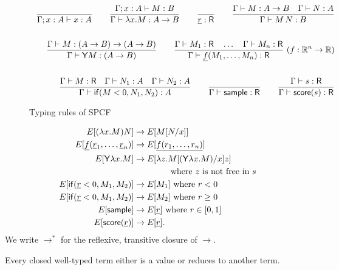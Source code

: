 \begin{figure*}
\begin{align*}
  \frac{}{\Gamma ; x:A \vdash x:A} 
  \qquad
  \frac{\Gamma ; x:A \vdash M : B}{\Gamma \vdash \lambda x.M : A \to B} 
  \qquad
  \frac{}{\underline{r} : \textsf{R}} 
  \qquad
  \frac{\Gamma \vdash M:A \to B \quad \Gamma \vdash N : A}{\Gamma \vdash M \, N : B} 
  \\ \\
  \qquad
  \frac{\Gamma \vdash M : (A \to B) \to (A \to B)}{\Gamma \vdash \mathsf{Y} M : (A \to B)}
  \qquad
  \frac{\Gamma \vdash M_1:\textsf{R} \quad \dots \quad \Gamma \vdash M_n:\textsf{R}}{\Gamma \vdash \underline{f}(M_1,\dots,M_n) : \textsf{R}} \ (f : \mathbb{R}^n \to \mathbb{R})    
  \\ \\
  \qquad
  \frac{\Gamma \vdash M : \textsf{R} \quad \Gamma \vdash N_1 : A \quad \Gamma \vdash N_2 : A}{\Gamma \vdash \mathsf{if}(M < 0, N_1, N_2) : A}
  \qquad
  \frac{}{\Gamma \vdash \mathsf{sample} : \textsf{R}} 
  \qquad
  \frac{\Gamma \vdash s : \textsf{R}}{\Gamma \vdash \mathsf{score} (s) : \textsf{R}}
\end{align*}
\caption{Typing rules of SPCF \label{fig:typing rules}}
\end{figure*}

\begin{align*}
  E[(\lambda x.M) N] & \to E[M[N/x]] \\
  E[\underline f (\underline r_1, \dots , \underline r_n)] & \to E[\underline{f(r_1,\dots,r_n)}] \\
  E[\mathsf{Y} \lambda x. M] & \to E[\lambda z. M[(\mathsf{Y} \lambda x. M)/x] z] \\
  & \qquad \qquad \text{ where $z$ is not free in $s$}\\
  E[\mathsf{if}(\underline r < 0, M_1, M_2)] & \to E[M_1] \text{ where }r < 0 \\
  E[\mathsf{if}(\underline r < 0, M_1, M_2)] & \to E[M_2] \text{ where }r \geq 0 \\
  E[\mathsf{sample}] & \to E[\underline r] \text{ where } r \in [0,1] \\
  E[\mathsf{score}(\underline r)] & \to E[\underline r].
\end{align*}
We write $\to^\ast$ for the reflexive, transitive closure of $\to$.

Every closed well-typed term either is a value or reduces to another term.

